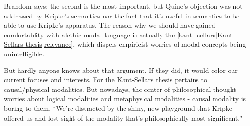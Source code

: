 Brandom says: the second is the most important, but Quine's objection was not addressed by Kripke's semantics nor the fact that it's useful in semantics to be able to use Kripke's apparatus. The reason why we should have gained comfortablity with alethic modal language is actually the \ref{kant_sellars|Kant-Sellars thesis|relevance}, which dispels empiricist worries of modal concepts being unintelligible.

But hardly anyone knows about that argument. If they did, it would color our current focuses and interests. For the Kant-Sellars thesis pertains to causal/physical modalities. But nowadays, the center of philosophical thought worries about logical modalities and metaphysical modalities - causal modality is boring to them. ``We're distracted by the shiny, new playground that Kripke offered us and lost sight of the modality that's philosophically most significant."